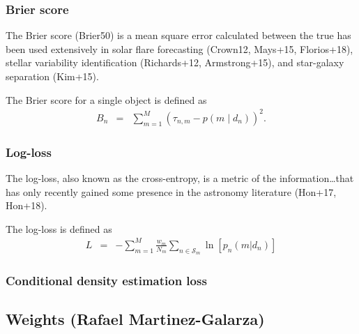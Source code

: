 
\subsubsection{Brier score}
\label{sec:brier}

The Brier score (Brier50) is a mean square error calculated between the true has been used extensively in solar flare forecasting (Crown12, Mays+15, Florios+18), stellar variability identification (Richards+12, Armstrong+15), and star-galaxy separation (Kim+15).

The Brier score for a single object is defined as
\begin{eqnarray}
B_{n} &=& \sum_{m=1}^{M}(\tau_{n, m}-p(m \mid d_{n}))^{2}.
\end{eqnarray}


\subsubsection{Log-loss}
\label{sec:logloss}


The log-loss, also known as the cross-entropy, is a metric of the information\dots that has only recently gained some presence in the astronomy literature (Hon+17, Hon+18).

The log-loss is defined as
\begin{eqnarray}
L &=& -\sum_{m=1}^{M}\frac{w_{m}}{N_{m}}\sum_{n\in\mathcal{S}_{m}}\ln[p_{n}(m | d_{n})]
\end{eqnarray}

\subsubsection{Conditional density estimation loss}
\label{sec:cdeloss}


\subsection{Weights (Rafael Martinez-Galarza)}
\label{sec:weights}

